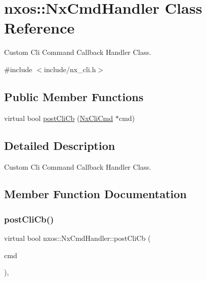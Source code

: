\hypertarget{classnxos_1_1_nx_cmd_handler}{}\section{nxos\+:\+:Nx\+Cmd\+Handler Class Reference}
\label{classnxos_1_1_nx_cmd_handler}


Custom Cli Command Callback Handler Class.  




{\ttfamily \#include $<$include/nx\+\_\+cli.\+h$>$}

\subsection*{Public Member Functions}
\begin{DoxyCompactItemize}
\item 
virtual bool \mbox{\hyperlink{classnxos_1_1_nx_cmd_handler_ab60a4672e08b1acd1faa249936963ead}{post\+Cli\+Cb}} (\mbox{\hyperlink{classnxos_1_1_nx_cli_cmd}{Nx\+Cli\+Cmd}} $\ast$cmd)
\end{DoxyCompactItemize}


\subsection{Detailed Description}
Custom Cli Command Callback Handler Class. 

\subsection{Member Function Documentation}
\mbox{\label{classnxos_1_1_nx_cmd_handler_ab60a4672e08b1acd1faa249936963ead}} 
\subsubsection{\texorpdfstring{post\+Cli\+Cb()}{postCliCb()}}
{\footnotesize\ttfamily virtual bool nxos\+::\+Nx\+Cmd\+Handler\+::post\+Cli\+Cb (\begin{DoxyParamCaption}\item[{\mbox{\hyperlink{classnxos_1_1_nx_cli_cmd}{Nx\+Cli\+Cmd}} $\ast$}]{cmd }\end{DoxyParamCaption})\hspace{0.3cm}{\ttfamily [inline]}, {\ttfamily [virtual]}}

